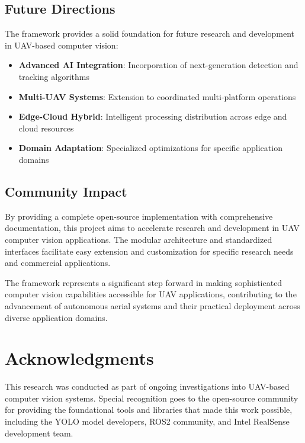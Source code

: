 \documentclass[11pt,a4paper]{article}
\begin{document}
\subsection{Future Directions}

The framework provides a solid foundation for future research and development in UAV-based computer vision:

\begin{itemize}
    \item \textbf{Advanced AI Integration}: Incorporation of next-generation detection and tracking algorithms
    \item \textbf{Multi-UAV Systems}: Extension to coordinated multi-platform operations
    \item \textbf{Edge-Cloud Hybrid}: Intelligent processing distribution across edge and cloud resources
    \item \textbf{Domain Adaptation}: Specialized optimizations for specific application domains
\end{itemize}

\subsection{Community Impact}

By providing a complete open-source implementation with comprehensive documentation, this project aims to accelerate research and development in UAV computer vision applications. The modular architecture and standardized interfaces facilitate easy extension and customization for specific research needs and commercial applications.

The framework represents a significant step forward in making sophisticated computer vision capabilities accessible for UAV applications, contributing to the advancement of autonomous aerial systems and their practical deployment across diverse application domains.

\section*{Acknowledgments}

This research was conducted as part of ongoing investigations into UAV-based computer vision systems. Special recognition goes to the open-source community for providing the foundational tools and libraries that made this work possible, including the YOLO model developers, ROS2 community, and Intel RealSense development team.
\end{document}
